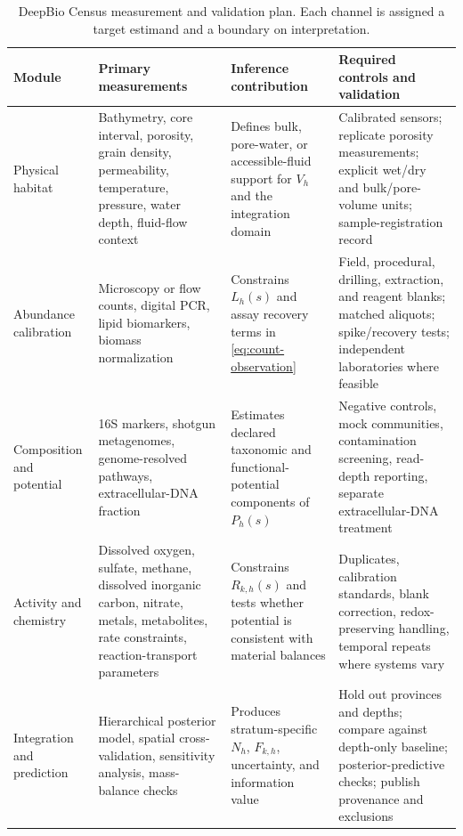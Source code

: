 \documentclass[conference]{../../../../Conference-LaTeX-template_10-17-19/IEEEtran}
\begin{document}
\begin{table}[t]
\caption{DeepBio Census measurement and validation plan. Each channel is assigned a target estimand and a boundary on interpretation.}
\label{tab:measurement-plan}
\centering
\footnotesize
\begin{tabularx}{\textwidth}{@{}p{}Y Y Y@{}}
\toprule
\textbf{Module} & \textbf{Primary measurements} & \textbf{Inference contribution} & \textbf{Required controls and validation} \\
\midrule
Physical habitat & Bathymetry, core interval, porosity, grain density, permeability, temperature, pressure, water depth, fluid-flow context & Defines bulk, pore-water, or accessible-fluid support for $V_h$ and the integration domain & Calibrated sensors; replicate porosity measurements; explicit wet/dry and bulk/pore-volume units; sample-registration record \\
Abundance calibration & Microscopy or flow counts, digital PCR, lipid biomarkers, biomass normalization & Constrains $L_h(s)$ and assay recovery terms in \eqref{eq:count-observation} & Field, procedural, drilling, extraction, and reagent blanks; matched aliquots; spike/recovery tests; independent laboratories where feasible \\
Composition and potential & 16S markers, shotgun metagenomes, genome-resolved pathways, extracellular-DNA fraction & Estimates declared taxonomic and functional-potential components of $P_h(s)$ & Negative controls, mock communities, contamination screening, read-depth reporting, separate extracellular-DNA treatment \\
Activity and chemistry & Dissolved oxygen, sulfate, methane, dissolved inorganic carbon, nitrate, metals, metabolites, rate constraints, reaction-transport parameters & Constrains $R_{k,h}(s)$ and tests whether potential is consistent with material balances & Duplicates, calibration standards, blank correction, redox-preserving handling, temporal repeats where systems vary \\
Integration and prediction & Hierarchical posterior model, spatial cross-validation, sensitivity analysis, mass-balance checks & Produces stratum-specific $N_h$, $F_{k,h}$, uncertainty, and information value & Hold out provinces and depths; compare against depth-only baseline; posterior-predictive checks; publish provenance and exclusions \\
\bottomrule
\end{tabularx}
\end{table}
\end{document}
